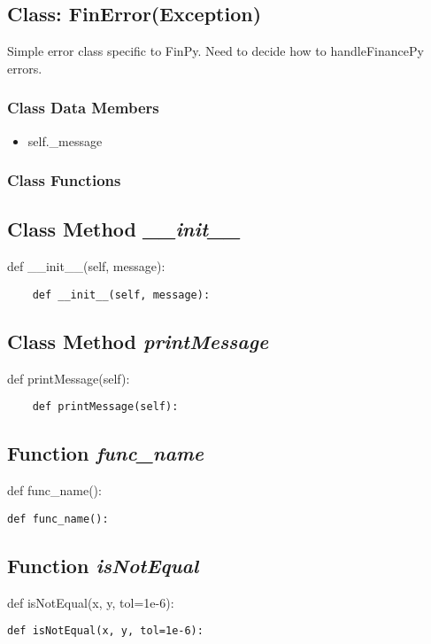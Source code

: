\documentclass[twoside,11pt]{book}
\begin{document}
\subsection{Class: FinError(Exception)}
Simple error class specific to FinPy. Need to decide how to handleFinancePy errors. 

\subsubsection{Class Data Members}
\begin{itemize}
\item{self.\_message}
\end{itemize}

\subsubsection{Class Functions}

\subsection{Class Method {\it \_\_init\_\_}}
def \_\_init\_\_(self, message):

\begin{lstlisting}
    def __init__(self, message):
\end{lstlisting}

\subsection{Class Method {\it printMessage}}
def printMessage(self):

\begin{lstlisting}
    def printMessage(self):
\end{lstlisting}

\subsection{Function {\it func\_name}}
def func\_name():

\begin{lstlisting}
def func_name():
\end{lstlisting}

\subsection{Function {\it isNotEqual}}
def isNotEqual(x, y, tol=1e-6):

\begin{lstlisting}
def isNotEqual(x, y, tol=1e-6):
\end{lstlisting}
\end{document}
